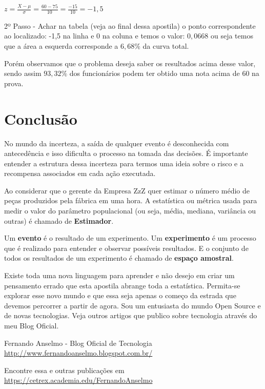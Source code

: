 \documentclass[a4paper,11pt]{article}
\begin{document}
$z = \frac{X - \mu}{\sigma} = \frac{60 - 75}{10} = \frac{-15}{10} = -1,5$

2º Passo - Achar na tabela (veja ao final dessa apostila) o ponto correspondente ao localizado: -1,5 na linha e 0 na coluna e temos o valor: $0,0668$ ou seja temos que a área a esquerda corresponde a $6,68\%$ da curva total. 

Porém observamos que o problema deseja saber os resultados acima desse valor, sendo assim $93,32\%$ dos funcionários podem ter obtido uma nota acima de 60 na prova.

\section{Conclusão}
No mundo da incerteza, a saída de qualquer evento é desconhecida com antecedência e isso dificulta o processo na tomada das decisões. É importante entender a estrutura dessa incerteza para termos uma ideia sobre o risco e a recompensa associados em cada ação executada. 

Ao considerar que o gerente da Empresa ZzZ quer estimar o número médio de peças produzidos pela fábrica em uma hora. A estatística ou métrica usada para medir o valor do parâmetro populacional (ou seja, média, mediana, variância ou outras) é chamado de \textbf{Estimador}.

Um \textbf{evento} é o resultado de um experimento. Um \textbf{experimento} é um processo que é realizado para entender e observar possíveis resultados. E o conjunto de todos os resultados de um experimento é chamado de \textbf{espaço amostral}.

Existe toda uma nova linguagem para aprender e não desejo em criar um pensamento errado que esta apostila abrange toda a estatística. Permita-se explorar esse novo mundo e que essa seja apenas o começo da estrada que devemos percorrer a partir de agora. Sou um entusiasta do mundo Open Source e de novas tecnologias. Veja outros artigos que publico sobre tecnologia através do meu Blog Oficial\cite{fernandoanselmo}.


\begin{thebibliography}{2}
	Fernando Anselmo - Blog Oficial de Tecnologia \\
	\url{http://www.fernandoanselmo.blogspot.com.br/}
	
	Encontre essa e outras publicações em \\
	\url{https://cetrex.academia.edu/FernandoAnselmo}
\end{thebibliography}
\end{document}
